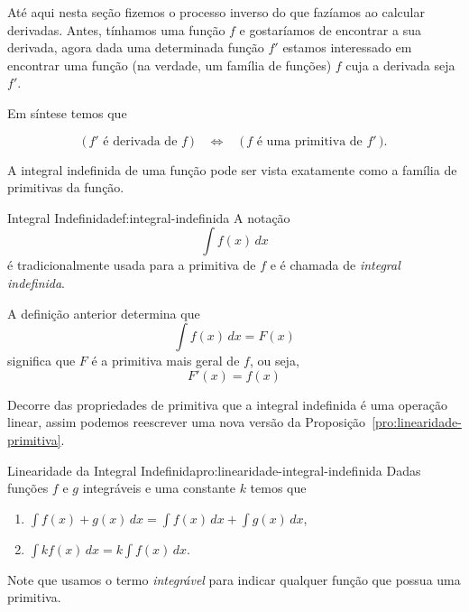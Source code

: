 Até aqui nesta seção fizemos o processo inverso do que fazíamos ao
calcular derivadas.
Antes, tínhamos uma função $f$ e gostaríamos de encontrar a sua derivada,
agora dada uma determinada função $f'$ estamos interessado em encontrar uma
função (na verdade, um família de funções) $f$ cuja a derivada seja $f'$.

Em síntese temos que
\begin{ceqn}
\[
    \Big(\,f' \text{ é derivada de } f \,\Big)
    \quad\Leftrightarrow\quad
    \Big(\,f \text{ é uma primitiva de } f' \,\Big).
\]
\end{ceqn}

A integral indefinida de uma função pode ser vista exatamente como a família de
primitivas da função.

\begin{definicao}{Integral Indefinida}{def:integral-indefinida}
  A notação
  \[
    \int f(x) \,dx
  \]
  é tradicionalmente usada para a primitiva de $f$ e é chamada de
  \emph{integral indefinida}.
\end{definicao}

A definição anterior determina que
\[
    \int f(x) \,dx = F(x)
\]
significa que $F$ é a primitiva mais geral de $f$, ou seja,
\[
  F'(x) = f(x)
\]

Decorre das propriedades de primitiva que a integral indefinida
é uma operação linear, assim podemos reescrever uma nova versão da
Proposição~\ref{pro:linearidade-primitiva}.

\begin{proposicao}{Linearidade da Integral Indefinida}{pro:linearidade-integral-indefinida}
  Dadas funções $f$ e $g$ integráveis e uma constante $k$ temos que
  \begin{enumerate}[parsep=11pt]
  \item \(\int f(x) + g(x) \,dx = \int f(x) \,dx + \int g(x) \,dx\),
  \item \(\int k f(x) \,dx = k \int f(x) \,dx\).
  \end{enumerate}
\end{proposicao}

Note que usamos o termo \emph{integrável} para
indicar qualquer função que possua uma primitiva.

